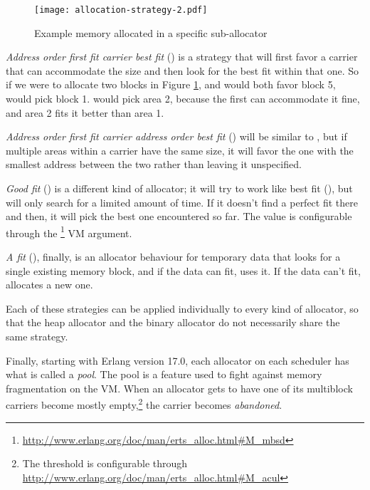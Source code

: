 \documentclass[11pt, oneside]{book}   	%
\begin{document}
\begin{figure}
  \texttt{[image: allocation-strategy-2.pdf]}%
  \centering%
  \caption{Example memory allocated in a specific sub-allocator}%
   \label{fig:allocation-strategy-2}
\end{figure}
\FloatBarrier

\emph{Address order first fit carrier best fit} () is a strategy that will first favor a carrier that can accommodate the size and then look for the best fit within that one. So if we were to allocate two blocks in Figure \ref{fig:allocation-strategy-2},  and  would both favor block 5,  would pick block 1.  would pick area 2, because the first  can accommodate it fine, and area 2 fits it better than area 1.

\emph{Address order first fit carrier address order best fit} () will be similar to , but if multiple areas within a carrier have the same size, it will favor the one with the smallest address between the two rather than leaving it unspecified.

\emph{Good fit} () is a different kind of allocator; it will try to work like best fit (), but will only search for a limited amount of time. If it doesn't find a perfect fit there and then, it will pick the best one encountered so far. The value is configurable through the \footnote{\href{http://www.erlang.org/doc/man/erts\_alloc.html\#M\_mbsd}{http://www.erlang.org/doc/man/erts\_alloc.html\#M\_mbsd}} VM argument.

\emph{A fit} (), finally, is an allocator behaviour for temporary data that looks for a single existing memory block, and if the data can fit,  uses it. If the data can't fit,  allocates a new one.

Each of these strategies can be applied individually to every kind of allocator, so that the heap allocator and the binary allocator do not necessarily share the same strategy.

Finally, starting with Erlang version 17.0, each  allocator on each scheduler has what is called a \emph{ pool}. The  pool is a feature used to fight against memory fragmentation on the VM. When an allocator gets to have one of its multiblock carriers become mostly empty,\footnote{The threshold is configurable through \href{http://www.erlang.org/doc/man/erts\_alloc.html\#M\_acul}{http://www.erlang.org/doc/man/erts\_alloc.html\#M\_acul}} the carrier becomes \emph{abandoned}. 
\end{document}
